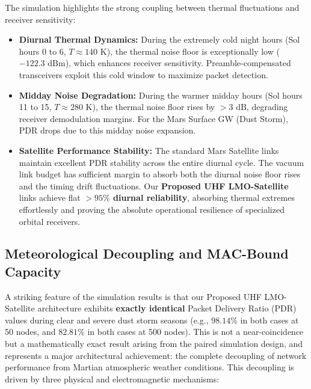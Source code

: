 \documentclass[journal,10pt,doublecolumn]{IEEEtran}
\begin{document}
The simulation highlights the strong coupling between thermal fluctuations and receiver sensitivity:
\begin{itemize}
    \item \textbf{Diurnal Thermal Dynamics:} During the extremely cold night hours (Sol hours 0 to 6, $T \approx 140\text{ K}$), the thermal noise floor is exceptionally low ($-122.3\text{ dBm}$), which enhances receiver sensitivity. Preamble-compensated transceivers exploit this cold window to maximize packet detection.
    \item \textbf{Midday Noise Degradation:} During the warmer midday hours (Sol hours 11 to 15, $T \approx 280\text{ K}$), the thermal noise floor rises by $>3\text{ dB}$, degrading receiver demodulation margins. For the Mars Surface GW (Dust Storm), PDR drops due to this midday noise expansion.
    \item \textbf{Satellite Performance Stability:} The standard Mars Satellite links maintain excellent PDR stability across the entire diurnal cycle. The vacuum link budget has sufficient margin to absorb both the diurnal noise floor rises and the timing drift fluctuations. Our \textbf{Proposed UHF LMO-Satellite} links achieve flat \textbf{$>95\%$ diurnal reliability}, absorbing thermal extremes effortlessly and proving the absolute operational resilience of specialized orbital receivers.
\end{itemize}

\subsection{Meteorological Decoupling and MAC-Bound Capacity}
A striking feature of the simulation results is that our Proposed UHF LMO-Satellite architecture exhibits \textbf{exactly identical} Packet Delivery Ratio (PDR) values during clear and severe dust storm seasons (e.g., $98.14\%$ in both cases at 50 nodes, and $82.81\%$ in both cases at 500 nodes). This is not a near-coincidence but a mathematically exact result arising from the paired simulation design, and represents a major architectural achievement: the complete decoupling of network performance from Martian atmospheric weather conditions. This decoupling is driven by three physical and electromagnetic mechanisms:
\end{document}
